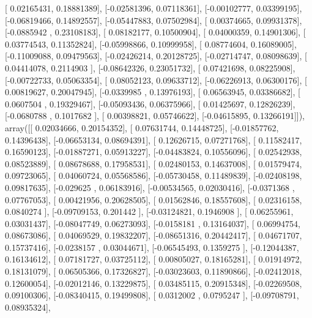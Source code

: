 \documentclass{article}
\begin{document}
       [ 0.02165431,  0.18881389],
       [-0.02581396,  0.07118361],
       [-0.00102777,  0.03399195],
       [-0.06819466,  0.14892557],
       [-0.05447883,  0.07502984],
       [ 0.00374665,  0.09931378],
       [-0.0885942 ,  0.23108183],
       [ 0.08182177,  0.10500904],
       [ 0.04000359,  0.14901306],
       [ 0.03774543,  0.11352824],
       [-0.05998866,  0.10999958],
       [ 0.08774604,  0.16089005],
       [-0.11009088,  0.09479563],
       [-0.02426214,  0.20128725],
       [-0.02714747,  0.08098639],
       [ 0.04414078,  0.2114903 ],
       [-0.08642326,  0.23051732],
       [ 0.07421698,  0.08225908],
       [-0.00722733,  0.05063354],
       [ 0.08052123,  0.09633712],
       [-0.06226913,  0.06300176],
       [ 0.00819627,  0.20047945],
       [-0.0339985 ,  0.13976193],
       [ 0.06563945,  0.03386682],
       [ 0.0607504 ,  0.19329467],
       [-0.05093436,  0.06375966],
       [ 0.01425697,  0.12826239],
       [-0.0680788 ,  0.1017682 ],
       [ 0.00398821,  0.05746622],
       [-0.04615895,  0.13266191]]), array([[ 0.02034666,  0.20154352],
       [ 0.07631744,  0.14448725],
       [-0.01857762,  0.14396438],
       [-0.06653134,  0.08694391],
       [ 0.12626715,  0.07271768],
       [ 0.11582417,  0.16590123],
       [-0.01887271,  0.05913227],
       [-0.04483824,  0.10556096],
       [ 0.02542938,  0.08523889],
       [ 0.08678688,  0.17958531],
       [ 0.02480153,  0.14637008],
       [ 0.01579474,  0.09723065],
       [ 0.04060724,  0.05568586],
       [-0.05730458,  0.11489839],
       [-0.02408198,  0.09817635],
       [-0.029625  ,  0.06183916],
       [-0.00534565,  0.02030416],
       [-0.0371368 ,  0.07767053],
       [ 0.00421956,  0.20628505],
       [ 0.01562846,  0.18557608],
       [ 0.02316158,  0.0840274 ],
       [-0.09709153,  0.201442  ],
       [-0.03124821,  0.1946908 ],
       [ 0.06255961,  0.03031437],
       [-0.08047749,  0.06273093],
       [-0.0158181 ,  0.13164037],
       [ 0.06994754,  0.08673086],
       [ 0.04069529,  0.19832207],
       [-0.08651316,  0.20442417],
       [ 0.04671707,  0.15737416],
       [-0.0238157 ,  0.03044671],
       [-0.06545493,  0.1359275 ],
       [-0.12044387,  0.16134612],
       [ 0.07181727,  0.03725112],
       [ 0.00805027,  0.18165281],
       [ 0.01914972,  0.18131079],
       [ 0.06505366,  0.17326827],
       [-0.03023603,  0.11890866],
       [-0.02412018,  0.12600054],
       [-0.02012146,  0.13229875],
       [ 0.03485115,  0.20915348],
       [-0.02269508,  0.09100306],
       [-0.08340415,  0.19499808],
       [ 0.0312002 ,  0.0795247 ],
       [-0.09708791,  0.08935324],
\end{document}
